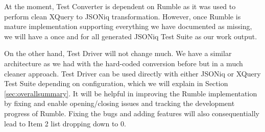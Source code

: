 

At the moment, Test Converter is dependent on Rumble as it was used to perform clean XQuery to JSONiq transformation. However, once Rumble is mature implementation supporting everything we have documented as missing, we will have a once and for all generated JSONiq Test Suite as our work output. 

On the other hand, Test Driver will not change much. We have a similar architecture as we had with the hard-coded conversion before but in a much cleaner approach. Test Driver can be used directly with either JSONiq or XQuery Test Suite depending on configuration, which we will explain in Section \ref{sec:overallsummary}. It will be helpful in improving the Rumble implementation by fixing and enable opening/closing issues and tracking the development progress of Rumble. Fixing the bugs and adding features will also consequentially lead to Item 2 list dropping down to 0. 
